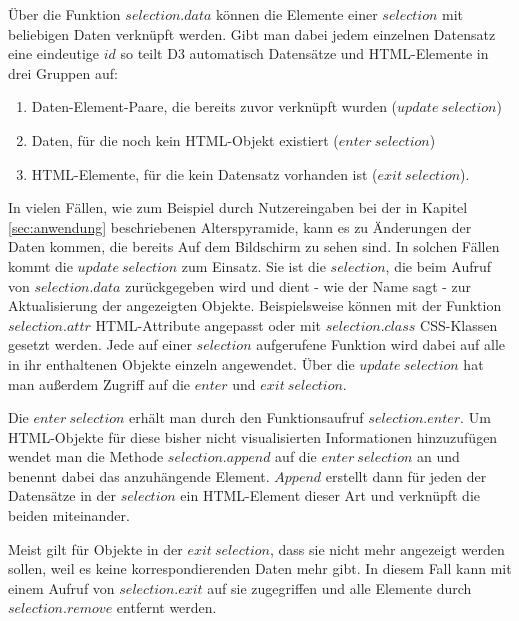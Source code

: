 Über die Funktion $selection.data$ können die Elemente einer $selection$ mit beliebigen Daten verknüpft werden. Gibt man dabei jedem einzelnen Datensatz eine eindeutige $id$ so teilt D3 automatisch Datensätze und HTML-Elemente in drei Gruppen auf: 
\begin{enumerate}
	\item Daten-Element-Paare, die bereits zuvor verknüpft wurden ($update\ selection$)
	\item Daten, für die noch kein HTML-Objekt existiert ($enter\ selection$)
	\item HTML-Elemente, für die kein Datensatz vorhanden ist ($exit\ selection$).
\end{enumerate}

In vielen Fällen, wie zum Beispiel durch Nutzereingaben bei der in Kapitel \ref{sec:anwendung} beschriebenen Alterspyramide, kann es zu Änderungen der Daten kommen, die bereits Auf dem Bildschirm zu sehen sind. In solchen Fällen kommt die $update\ selection$ zum Einsatz. Sie ist die $selection$, die beim Aufruf von $selection.data$ zurückgegeben wird und dient - wie der Name sagt - zur Aktualisierung der angezeigten Objekte. Beispielsweise können mit der Funktion $selection.attr$ HTML-Attribute angepasst oder mit $selection.class$ CSS-Klassen gesetzt werden. Jede auf einer $selection$ aufgerufene Funktion wird dabei auf alle in ihr enthaltenen Objekte einzeln angewendet. Über die $update\ selection$ hat man außerdem Zugriff auf die $enter$ und $exit\ selection$.

Die $enter\ selection$ erhält man durch den Funktionsaufruf $selection.enter$. Um HTML-Objekte für diese bisher nicht visualisierten Informationen hinzuzufügen wendet man die Methode $selection.append$ auf die $enter\ selection$ an und benennt dabei das anzuhängende Element. $Append$ erstellt dann für jeden der Datensätze in der $selection$ ein HTML-Element dieser Art und verknüpft die beiden miteinander.

Meist gilt für Objekte in der $exit\ selection$, dass sie nicht mehr angezeigt werden sollen, weil es keine korrespondierenden Daten mehr gibt. In diesem Fall kann mit einem Aufruf von $selection.exit$ auf sie zugegriffen und alle Elemente durch $selection.remove$ entfernt werden.

